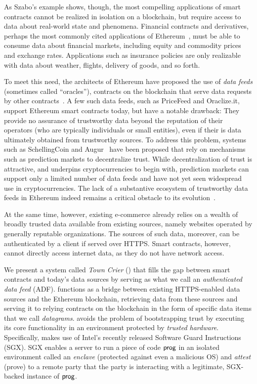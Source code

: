 As Szabo's example shows, though, the most compelling applications of smart contracts cannot be realized in isolation on a blockchain, but require access to data about real-world state and phenomena. Financial contracts and derivatives, perhaps the most commonly cited applications of Ethereum~\cite{}, must be able to consume data about financial markets, including equity and commodity prices and exchange rates. Applications such as insurance policies are only realizable with data about weather, flights, delivery of goods, and so forth. 

To meet this need, the architects of Ethereum have proposed the use of \emph{data feeds} (sometimes called ``oracles''), contracts on the blockchain that serve data requests by other contracts~\cite{whitepaper,yellowpaper}. A few such data feeds, such as PriceFeed and Oraclize.it, support Ethereum smart contracts today, but have a notable drawback: They provide no assurance of trustworthy data beyond the reputation of their operators (who are typically individuals or small entities), even if their is data ultimately obtained from trustworthy sources. To address this problem, systems such as SchellingCoin and Augur~\cite{} have been proposed that rely on mechanisms such as prediction markets to decentralize trust. While decentralization of trust is attractive, and underpins cryptocurrencies to begin with, prediction markets can support only a limited number of data feeds and have not yet seen widespread use in cryptocurrencies. The lack of a substantive ecosystem of trustworthy data feeds in Ethereum indeed remains a critical obstacle to its evolution~\cite{???}.

At the same time, however, existing e-commerce already relies on a wealth of broadly trusted data available from existing sources, namely websites operated by generally reputable organizations. The sources of such data, moreover, can be authenticated by a client if served over HTTPS. Smart contracts, however, cannot directly access internet data, as they do not have network access.

We present a system called \emph{Town Crier} (\tc) that fills the gap between smart contracts and today's data sources by serving as what we call an \emph{authenticated data feed} (ADF). \tc functions as a bridge between existing HTTPS-enabled data sources and the Ethereum blockchain, retrieving data from these sources and serving it to relying contracts on the blockchain in the form of specific data items that we call \emph{datagrams}. \tc avoids the problem of bootstrapping trust by executing its core functionality in an environment protected by \emph{trusted hardware}. Specifically, \tc makes use of Intel's recently released Software Guard Instructions (SGX). SGX enables a server to run a piece of code ${\sf prog}$ in an isolated environment called an \emph{enclave} (protected against even a malicious OS) and \emph{attest} (prove) to a remote party that the party is interacting with a legitimate, SGX-backed instance of ${\sf prog}$. 

